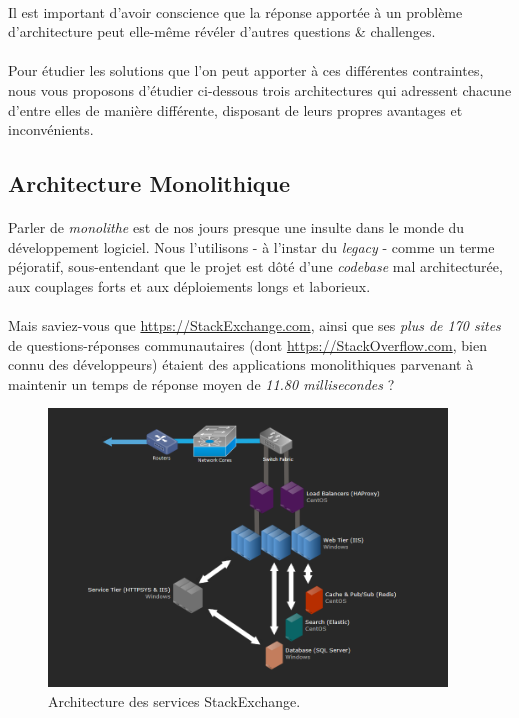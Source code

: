\paragraph{} Il est important d'avoir conscience que la réponse apportée à un problème d'architecture peut elle-même révéler 
d'autres questions \& challenges.

\paragraph{} Pour étudier les solutions que l'on peut apporter à ces différentes contraintes, nous vous proposons d'étudier
ci-dessous trois architectures qui adressent chacune d'entre elles de manière différente, disposant de leurs propres
avantages et inconvénients.


\subsection*{Architecture Monolithique}

\paragraph{} Parler de \emph{monolithe} est de nos jours presque une insulte dans le monde du développement logiciel. Nous 
l'utilisons - à l'instar du \emph{legacy} - comme un terme péjoratif, sous-entendant que le projet est dôté d'une \emph{codebase}
mal architecturée, aux couplages forts et aux déploiements longs et laborieux.

\paragraph{} Mais saviez-vous que \url{https://StackExchange.com}, ainsi que ses \emph{plus de 170 sites} de questions-réponses
communautaires (dont \url{https://StackOverflow.com}, bien connu des développeurs) étaient des applications monolithiques 
parvenant à maintenir un temps de réponse moyen de \emph{11.80 millisecondes} \cite{Microservices7} ?

\begin{figure}[ht]
    \centering
    \includegraphics[width=400px]{chapters/02/images/stackexchange.png}
    \caption{\label{stackexchange_architecture}Architecture des services StackExchange.}
\end{figure}

